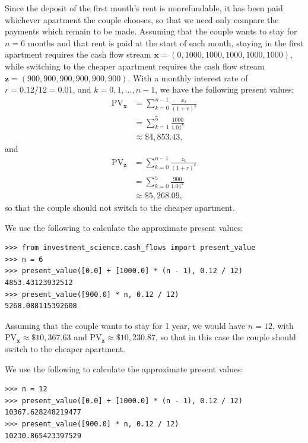 Since the deposit of the first month's rent is nonrefundable, it has been
paid whichever apartment the couple chooses, so that we need only compare the
payments which remain to be made. Assuming that the couple wants to stay for
$n = 6$ months and that rent is paid at the start of each month, staying in
the first apartment requires the cash flow stream
$\mathbf{x} = (0, 1000, 1000, 1000, 1000, 1000)$, while switching to the
cheaper apartment requires the cash flow stream
$\mathbf{z} = (900, 900, 900, 900, 900, 900)$. With a monthly interest rate
of $r = 0.12 / 12 = 0.01$, and $k = 0, 1, \ldots, n - 1$, we have the
following present values:
\begin{equation*}
    \begin{split}
        {\text{PV}}_{\mathbf{x}} &= \sum_{k = 0}^{n - 1}{\frac{x_k}{{(1 + r)}^k}} \\
        &= \sum_{k = 1}^5{\frac{1000}{1.01^k}} \\
        &\approx \$4,853.43,
    \end{split}
\end{equation*}
and
\begin{equation*}
    \begin{split}
        {\text{PV}}_{\mathbf{z}} &= \sum_{k = 0}^{n - 1}{\frac{z_k}{{(1 + r)}^k}} \\
        &= \sum_{k = 0}^5{\frac{900}{1.01^k}} \\
        &\approx \$5,268.09,
    \end{split}
\end{equation*}
so that the couple should not switch to the cheaper apartment.

We use the following to calculate the approximate present values:
\begin{lstlisting}
>>> from investment_science.cash_flows import present_value
>>> n = 6
>>> present_value([0.0] + [1000.0] * (n - 1), 0.12 / 12)
4853.43123932512
>>> present_value([900.0] * n, 0.12 / 12)
5268.088115392608
\end{lstlisting}

Assuming that the couple wants to stay for 1 year, we would have $n = 12$,
with ${\text{PV}}_{\mathbf{x}} \approx \$10,367.63$ and
${\text{PV}}_{\mathbf{z}} \approx \$10,230.87$, so that in this case the
couple should switch to the cheaper apartment.

We use the following to calculate the approximate present values:
\begin{lstlisting}
>>> n = 12
>>> present_value([0.0] + [1000.0] * (n - 1), 0.12 / 12)
10367.628248219477
>>> present_value([900.0] * n, 0.12 / 12)
10230.865423397529
\end{lstlisting}
